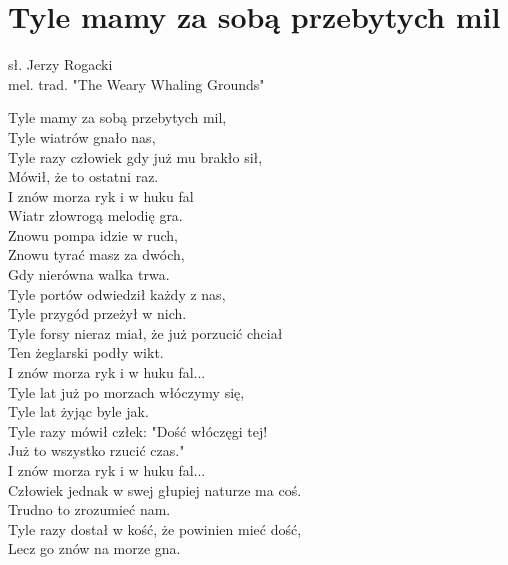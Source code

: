 \section{Tyle mamy za sobą przebytych mil}

sł. Jerzy Rogacki\\
mel. trad. "The Weary Whaling Grounds"

\vspace{2em}
Tyle mamy za sobą przebytych mil, \\
Tyle wiatrów gnało nas, \\
Tyle razy człowiek gdy już mu brakło sił, \\
Mówił, że to ostatni raz. \\

I znów morza ryk i w huku fal \\
Wiatr złowrogą melodię gra. \\
Znowu pompa idzie w ruch, \\
Znowu tyrać masz za dwóch, \\
Gdy nierówna walka trwa. \\

Tyle portów odwiedził każdy z nas, \\
Tyle przygód przeżył w nich. \\
Tyle forsy nieraz miał, że już porzucić chciał \\
Ten żeglarski podły wikt. \\

I znów morza ryk i w huku fal... \\

Tyle lat już po morzach włóczymy się, \\
Tyle lat żyjąc byle jak. \\
Tyle razy mówił człek: "Dość włóczęgi tej! \\
Już to wszystko rzucić czas." \\

I znów morza ryk i w huku fal... \\

Człowiek jednak w swej głupiej naturze ma coś. \\
Trudno to zrozumieć nam. \\
Tyle razy dostał w kość, że powinien mieć dość, \\
Lecz go znów na morze gna.